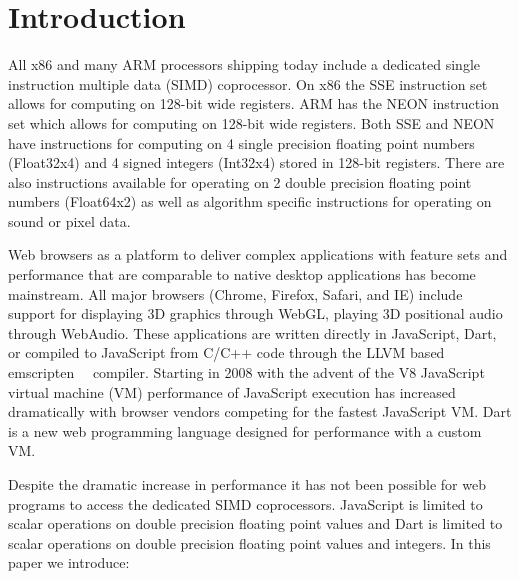 \documentclass[preprint]{sigplanconf}
\begin{document}
\section{Introduction}
All x86 and many ARM processors shipping today include a dedicated single instruction multiple data (SIMD) coprocessor.  On x86 the SSE instruction set allows for computing on 128-bit wide registers. ARM has the NEON instruction set which allows for computing on 128-bit wide registers. Both SSE and NEON have instructions for computing on 4 single precision floating point numbers (Float32x4) and 4 signed integers (Int32x4) stored in 128-bit registers. There are also instructions available for operating on 2 double precision floating point numbers (Float64x2) as well as algorithm specific instructions for operating on sound or pixel data.

Web browsers as a platform to deliver complex applications with feature sets and performance that are comparable to native desktop applications has become mainstream. All major browsers (Chrome, Firefox, Safari, and IE) include support for displaying 3D graphics through WebGL, playing 3D positional audio through WebAudio. These applications are written directly in JavaScript, Dart, or compiled to JavaScript from C/C++ code through the LLVM based emscripten~~\cite{emscripten} compiler. Starting in 2008 with the advent of the V8 JavaScript virtual machine (VM) performance of JavaScript execution has increased dramatically with browser vendors competing for the fastest JavaScript VM. Dart is a new web programming language designed for performance with a custom VM.

Despite the dramatic increase in performance it has not been possible for web programs to access the dedicated SIMD coprocessors. JavaScript is limited to scalar operations on double precision floating point values and Dart is limited to scalar operations on double precision floating point values and integers. In this paper we introduce:
\end{document}

